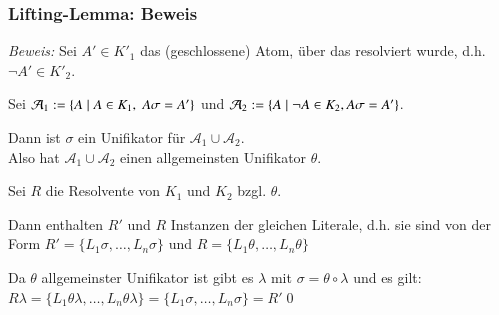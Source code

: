 \documentclass[aspectratio=1610,onlymath]{beamer}
\begin{document}
\begin{frame}\frametitle{Lifting-Lemma: Beweis}


\emph{Beweis:} Sei $A'\in K'_1$ das (geschlossene) Atom, über das resolviert wurde, d.h. $\neg A'\in K'_2$.\smallskip\pause

Sei $\mathcal{A}_1\mathrel{:=}\{A\mid A\in K_1,\;A\sigma=A'\}$ und $\mathcal{A}_2\mathrel{:=}\{A\mid \neg A\in K_2, A\sigma=A'\}$.\smallskip\pause

Dann ist $\sigma$ ein Unifikator für $\mathcal{A}_1\cup\mathcal{A}_2$.\\ Also hat $\mathcal{A}_1\cup\mathcal{A}_2$ einen allgemeinsten Unifikator $\theta$.\smallskip\pause

Sei $R$ die Resolvente von $K_1$ und $K_2$ bzgl. $\theta$.\smallskip\pause

Dann enthalten $R'$ und $R$ Instanzen der gleichen Literale, d.h. sie sind von der Form
$R'=\{L_1\sigma,\ldots,L_n\sigma\}$ und $R=\{L_1\theta,\ldots,L_n\theta\}$\smallskip\pause

Da $\theta$ allgemeinster Unifikator ist gibt es $\lambda$ mit $\sigma=\theta\circ\lambda$
und es gilt: $R\lambda=\{L_1\theta\lambda,\ldots,L_n\theta\lambda\}=\{L_1\sigma,\ldots,L_n\sigma\}=R'$\qed


\end{frame}
\end{document}
